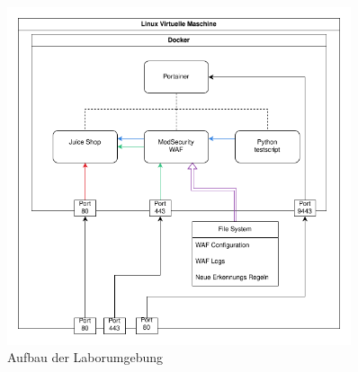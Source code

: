 \begin{figure}[!hbt]
    \centering
    \includegraphics[width=0.9\textwidth]{./images/lab-setup.png}
    \caption{Aufbau der Laborumgebung}
    \label{fig:lab}
\end{figure}

